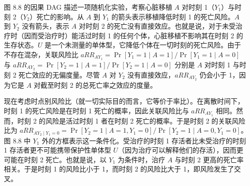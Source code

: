 \begin{techpoint}[风险比固有的选择偏倚]
图 8.8 的因果 DAG 描述一项随机化实验，考察心脏移植 $A$ 对时刻 1（$Y_1$）与时刻 2（$Y_2$）死亡的影响。从 $A$ 到 $Y_1$ 的箭头表示移植降低时刻 1 的死亡风险。$A$ 到 $Y_2$ 没有箭头，表示 $A$ 对时刻 2 的死亡没有直接效应。也就是说，对于未受治疗时（因而受治疗时）能活过时刻 1 的任何个体，心脏移植不影响其在时刻 2 的生存状态。$U$ 是一个未测量的单体型，它降低个体在一切时刻的死亡风险。由于不存在混杂，关联风险比 $aRR_{AY_1}=\Pr[Y_1=1\mid A=1]/\Pr[Y_1=1\mid A=0]$ 与 $aRR_{AY_2}=\Pr[Y_2=1\mid A=1]/\Pr[Y_2=1\mid A=0]$ 分别是 $A$ 对时刻 1 与时刻 2 死亡效应的无偏度量。尽管 $A$ 对 $Y_2$ 没有直接效应，$aRR_{AY_2}$ 仍会小于 1，因为它是 $A$ 对截至时刻 2 的总死亡率之效应的度量。

现在考虑时点别风险比（就一切实际目的而言，它等价于率比）。在离散时间下，时刻 1 的死亡风险是在时刻 1 死亡的概率，因此关联风险比与 $aRR_{AY_1}$ 相同。然而，时刻 2 的风险是活过时刻 1 者在时刻 2 死亡的概率。于是时刻 2 的关联风险比为 $aRR_{AY_2\mid Y_1=0}=\Pr[Y_2=1\mid A=1,Y_1=0]/\Pr[Y_2=1\mid A=0,Y_1=0]$。图 8.8 中 $Y_1$ 外的方框表示这一条件化。受治疗的时刻 1 存活者比未受治疗的时刻 1 存活者更不可能携带保护性单体型 $U$（因为治疗可以解释他们的存活），因而更可能在时刻 2 死亡。也就是说，以 $Y_1$ 为条件时，治疗 $A$ 与时刻 2 更高的死亡率相关。于是时刻 1 的风险比小于 1，而时刻 2 的风险比大于 1，即风险发生了交叉。

\begin{center}
\label{fig:8.8}
\end{center}

\begin{center}
\label{fig:8.9}
\end{center}


\end{techpoint}
